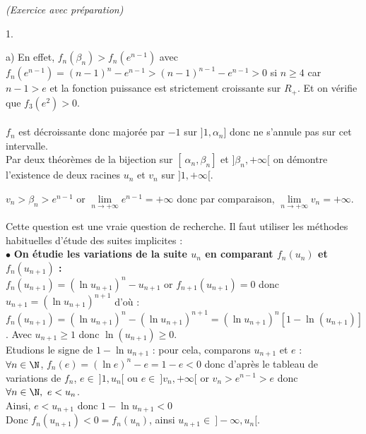 \documentclass[11pt]{article}%
\begin{document}
\begin{exercice}{\it (Exercice avec préparation)}
\begin{noliste}{1.}
\begin{noliste}{a)}
 En effet, $f_{n}(\beta_{n}) > f_{n}(e^{n-1})$ avec $f_{n}(e^{n-1}) =
(n-1)^{n}-e^{n-1} > (n-1)^{n-1}-e^{n-1} >0$ si $n \geq 4 $ car $n-1 >e$
et la fonction puissance est strictement croissante sur $R_{+}$. Et on
vérifie que $f_{3}(e^{2}) >0$.\\
\\
 $f_{n}$ est décroissante donc majorée par $-1$ sur $]1, \alpha_{n}]$
donc ne s'annule pas sur cet intervalle.\\
 Par deux théorèmes de la bijection sur $[ \ \alpha_{n}, \beta_{n}]$ et
$]\beta_{n}, + \infty[$ on démontre l'existence de deux racines $u_{n}$
et $v_{n}$ sur $]1, + \infty[$.
 \item $v_{n} > \beta_{n} > e^{n-1}$ or $\lim \limits_{n \to + \infty}
e^{n-1} = + \infty$ donc par comparaison, $\lim \limits_{n \to +
\infty} v_{n} = + \infty$.
 \end{noliste}
 \item Cette question est une vraie question de recherche. Il faut
utiliser les méthodes habituelles d'étude des suites implicites : \\
 $\bullet$ \textbf{On étudie les variations de la suite $u_{n}$ en
comparant $f_{n}(u_{n})$ et $f_{n}(u_{n + 1})$ :} \\
 $f_{n}(u_{n + 1}) = ( \ln u_{n + 1})^{n}-u_{n + 1} $ or $f_{n +
1}(u_{n + 1}) = 0$ donc $u_{n + 1} = (\ln u_{n + 1})^{n + 1}$ d'où : \\
 $f_{n}(u_{n + 1}) = ( \ln u_{n + 1})^{n}- ( \ln u_{n + 1})^{n + 1} = (
\ln u_{n + 1})^{n}[ 1-\ln(u_{n + 1})]$. Avec $u_{n + 1} \geq 1$ donc
$\ln(u_{n + 1}) \geq 0$.\\
 Etudions le signe de $1-\ln u_{n + 1} $ : pour cela, comparons $u_{n +
1}$ et $e$ : \\
 $\forall n \in \N$, $f_{n}(e) = ( \ln e)^{n} - e = 1-e<0 $ donc
d'après le tableau de variations de $f_{n}$, $e \in \ ]1, u_{n}[$ ou $e
\in \ ]v_{n}, + \infty[$ or $v_{n} > e^{n-1} > e$ donc $\forall n \in
\N, \ e < u_{n}$.\\
 Ainsi, $e < u_{n + 1}$ donc $1-\ln u_{n + 1} <0$ \\
 Donc $f_{n}(u_{n + 1}) <0 = f_{n}(u_{n})$, ainsi $u_{n + 1} \in \
]-\infty, u_{n}[$. 
 


\end{noliste}
\end{exercice}
\end{document}
